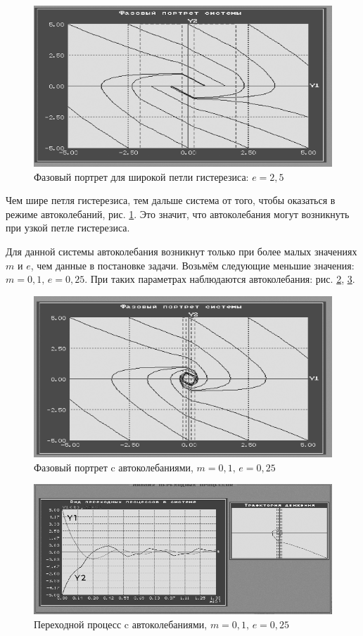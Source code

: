 	\begin{figure}[h]
		\centering\includegraphics[width=.6\textwidth]{png/15.png}
		\caption{Фазовый портрет для широкой петли гистерезиса: $e=2,5$}
		\label{issl1}
	\end{figure}
	
	Чем шире петля гистерезиса, тем дальше система от того, чтобы оказаться в режиме автоколебаний, рис. \ref{issl1}. Это значит, что автоколебания могут возникнуть при узкой петле гистерезиса.
	
	Для данной системы автоколебания возникнут только при более малых значениях $m$ и $e$, чем данные в постановке задачи. Возьмём следующие меньшие значения: $m=0,1,\,e=0,25$. При таких параметрах наблюдаются автоколебания: рис. \ref{issl2}, \ref{issl2_p}.
	
	\begin{figure}[h]
		\centering\includegraphics[width=.6\textwidth]{png/19.png}
		\caption{Фазовый портрет c автоколебаниями, $m=0,1,\,e=0,25$}
		\label{issl2}
	\end{figure}

	\begin{figure}[h]
		\centering\includegraphics[width=.6\textwidth]{png/20.png}
		\caption{Переходной процесс c автоколебаниями, $m=0,1,\,e=0,25$}
		\label{issl2_p}
	\end{figure}


